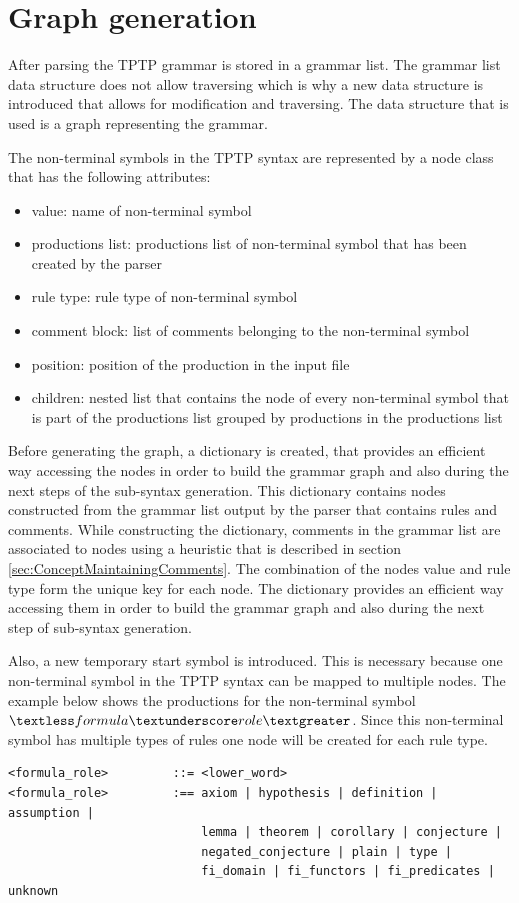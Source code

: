 \section{Graph generation}\label{sec:ConceptGraphGeneration}

After parsing the \ac{TPTP} grammar is stored in a grammar list. The grammar list data structure does not allow traversing which is why a new data structure is introduced that allows for modification and traversing.
The data structure that is used is a graph representing the grammar.

The non-terminal symbols in the \ac{TPTP} syntax are represented by a node class that has the following attributes:
\begin{itemize}
\item value: name of non-terminal symbol
\item productions list: productions list of non-terminal symbol that has been created by the parser
\item rule type: rule type of non-terminal symbol
\item comment block: list of comments belonging to the non-terminal symbol
\item position: position of the production in the input file
\item children: nested list that contains the node of every non-terminal symbol that is part of the productions list grouped by productions in the productions list
\end{itemize}

Before generating the graph, a dictionary is created, that provides an efficient way accessing the nodes in order to build the grammar graph and also during the next steps of the sub-syntax generation.
This dictionary contains nodes constructed from the grammar list output by the parser that contains rules and comments.
While constructing the dictionary, comments in the grammar list are associated to nodes using a heuristic that is described in section \ref{sec:ConceptMaintainingComments}.
The combination of the nodes value and rule type form the unique key for each node.
The dictionary provides an efficient way accessing them in order to build the grammar graph and also during the next step of sub-syntax generation.

Also, a new temporary start symbol is introduced.
This is necessary because one non-terminal symbol in the \ac{TPTP} syntax can be mapped to multiple nodes.
The example below shows the productions for the non-terminal symbol $\textless formula\textunderscore role\textgreater$.
Since this non-terminal symbol has multiple types of rules one node will be created for each rule type.
\begin{lstlisting}[caption= Productions of the non-terminal symbol $\textless formula\textunderscore role\textgreater$]
<formula_role>         ::= <lower_word>
<formula_role>         :== axiom | hypothesis | definition | assumption |
                           lemma | theorem | corollary | conjecture |
                           negated_conjecture | plain | type |
                           fi_domain | fi_functors | fi_predicates | unknown
\end{lstlisting}

